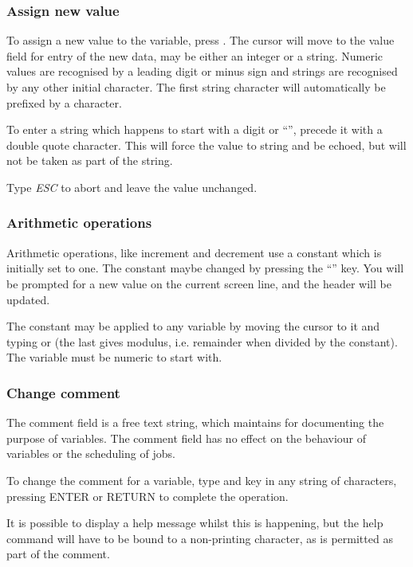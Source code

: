 \subsubsection{Assign new value}
To assign a new value to the variable, press .
The cursor will move to the value field for entry of the new data, may
be either an integer or a string. Numeric values are recognised by a
leading digit or minus sign and strings are recognised by any other
initial character. The first string character will automatically be
prefixed by a \exampletext{{\textquotedbl}} character.

To enter a string which happens to start with a digit or
``\exampletext{{}-}'', precede it with a double quote \exampletext{{\textquotedbl}} character.
This will force the value to string and be echoed, but will not be
taken as part of the string.

Type \textit{ESC} to abort and leave the value unchanged.

\subsubsection{Arithmetic operations}
Arithmetic operations, like increment and decrement use a constant which
is initially set to one. The constant maybe changed by pressing the
``\userentry{=}'' key. You will be
prompted for a new value on the current screen line, and the header
will be updated.

The constant may be applied to any variable by moving the cursor to it
and typing \userentry{+ - * /} or \userentry{\%}
(the last gives modulus, i.e. remainder when divided by the constant).
The variable must be numeric to start with.

\subsubsection{Change comment}
The comment field is a free text string, which \ProductName{} maintains for
documenting the purpose of variables. The comment field has no effect
on the behaviour of variables or the scheduling of jobs.

To change the comment for a variable, type
\userentry{{\textquotedbl}} and key in any string of
characters, pressing ENTER or RETURN to complete the operation.

It is possible to display a help message whilst this is happening, but
the help command will have to be bound to a non-printing character, as
 is permitted as part of the comment.

